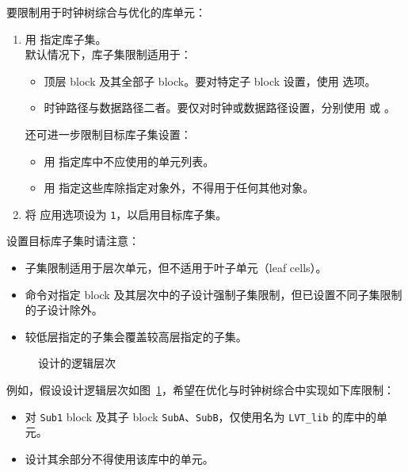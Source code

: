 要限制用于时钟树综合与优化的库单元：
\begin{enumerate}
  \item 用  指定库子集。\\
    默认情况下，库子集限制适用于：
    \begin{itemize}
      \item 顶层 block 及其全部子 block。要对特定子 block 设置，使用  选项。
      \item 时钟路径与数据路径二者。要仅对时钟或数据路径设置，分别使用  或 。
    \end{itemize}
    还可进一步限制目标库子集设置：
    \begin{itemize}
      \item 用  指定库中不应使用的单元列表。
      \item 用  指定这些库除指定对象外，不得用于任何其他对象。
    \end{itemize}
  \item 将  应用选项设为 \texttt{1}，以启用目标库子集。
\end{enumerate}

设置目标库子集时请注意：
\begin{itemize}
  \item 子集限制适用于层次单元，但不适用于叶子单元（leaf cells）。
  \item 命令对指定 block 及其层次中的子设计强制子集限制，但已设置不同子集限制的子设计除外。
  \item 较低层指定的子集会覆盖较高层指定的子集。
\end{itemize}

\begin{figure}[htbp]
\centering
{}
\caption{设计的逻辑层次}
\label{fig:logic-hier}
\end{figure}

例如，假设设计逻辑层次如图~\ref{fig:logic-hier}，希望在优化与时钟树综合中实现如下库限制：
\begin{itemize}
  \item 对 \texttt{Sub1} block 及其子 block \texttt{SubA}、\texttt{SubB}，仅使用名为 \texttt{LVT\_lib} 的库中的单元。
  \item 设计其余部分不得使用该库中的单元。
\end{itemize}

